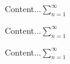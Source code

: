 \documentclass{article}
\begin{document}
    \begin{landscape}
        Content...$\sum_{n = 1}^{\infty}$  
    \end{landscape}
    \begin{landscape}
        Content...$\sum_{n = 1}^{\infty}$  
    \end{landscape}
    \begin{landscape}
        Content...$\sum_{n = 1}^{\infty}$  
    \end{landscape}
\end{document}
